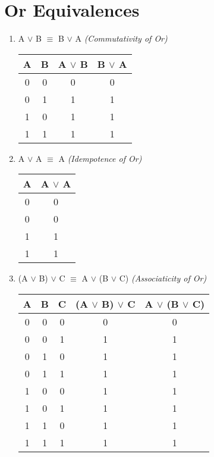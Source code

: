 \documentclass{report}
\begin{document}
\section{Or Equivalences}
\begin{enumerate}

  \item A $\lor$ B $\equiv$ B $\lor$ A \emph{(Commutativity of Or)}

\begin{center}
  \begin{tabular}{| c | c | c | c |}
    \hline
    A & B & A $\lor$ B & B $\lor$ A\\ \hline
    0 & 0 & 0 & 0 \\
    0 & 1 & 1 & 1 \\
    1 & 0 & 1 & 1 \\
    1 & 1 & 1 & 1 \\ \hline
  \end{tabular}
\end{center}

\item A $\lor$ A $\equiv$ A \emph{(Idempotence of Or)}

\begin{center}
  \begin{tabular}{| c | c |}
    \hline
    A & A $\lor$ A \\ \hline
    0 & 0 \\
    0 & 0 \\
    1 & 1 \\
    1 & 1 \\ \hline
  \end{tabular}
\end{center}

  \item (A $\lor$ B) $\lor$ C $\equiv$ A $\lor$ (B $\lor$ C) \emph{(Associaticity of Or)}

\begin{center}
  \begin{tabular}{| c | c | c | c | c |}
    \hline
    A & B & C & (A $\lor$ B) $\lor$ C & A $\lor$ (B $\lor$ C) \\ \hline
    0 & 0 & 0 & 0 & 0 \\
    0 & 0 & 1 & 1 & 1 \\
    0 & 1 & 0 & 1 & 1 \\
    0 & 1 & 1 & 1 & 1 \\
    1 & 0 & 0 & 1 & 1 \\
    1 & 0 & 1 & 1 & 1 \\
    1 & 1 & 0 & 1 & 1 \\
    1 & 1 & 1 & 1 & 1 \\ \hline
  \end{tabular}
\end{center}
\end{enumerate}
\end{document}
